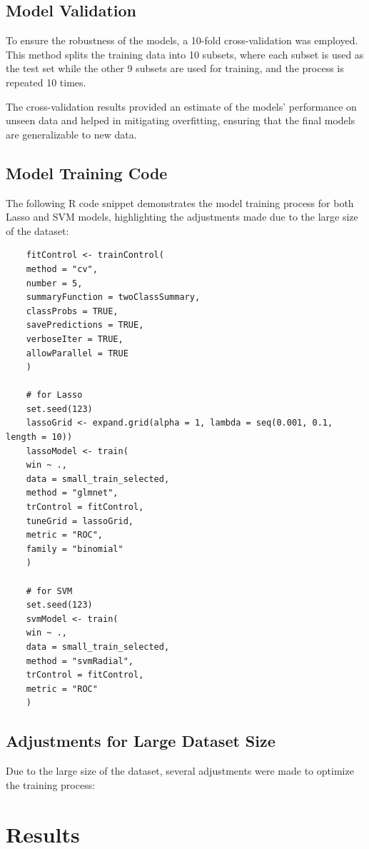 \documentclass[12pt]{article}
\begin{document}
\subsection{Model Validation}
To ensure the robustness of the models, a 10-fold cross-validation was employed. This method splits the training data into 10 subsets, where each subset is used as the test set while the other 9 subsets are used for training, and the process is repeated 10 times.

The cross-validation results provided an estimate of the models' performance on unseen data and helped in mitigating overfitting, ensuring that the final models are generalizable to new data.


\subsection{Model Training Code}
The following R code snippet demonstrates the model training process for both Lasso and SVM models, highlighting the adjustments made due to the large size of the dataset:

\begin{verbatim}
	fitControl <- trainControl(
	method = "cv",  
	number = 5,    
	summaryFunction = twoClassSummary,  
	classProbs = TRUE,  
	savePredictions = TRUE,  
	verboseIter = TRUE,  
	allowParallel = TRUE  
	)
	
	# for Lasso 
	set.seed(123)
	lassoGrid <- expand.grid(alpha = 1, lambda = seq(0.001, 0.1, length = 10))  
	lassoModel <- train(
	win ~ .,  
	data = small_train_selected,
	method = "glmnet",
	trControl = fitControl,
	tuneGrid = lassoGrid,
	metric = "ROC",
	family = "binomial"
	)
	
	# for SVM
	set.seed(123)
	svmModel <- train(
	win ~ .,
	data = small_train_selected,
	method = "svmRadial",
	trControl = fitControl,
	metric = "ROC"
	)
\end{verbatim}


\subsection{Adjustments for Large Dataset Size}
Due to the large size of the dataset, several adjustments were made to optimize the training process:



\section{Results}
\label{sec:resu}
\end{document}

